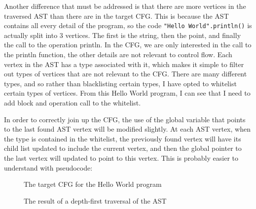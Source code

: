 Another difference that must be addressed is that there are more vertices in the traversed AST than there are in the target CFG. This is because the AST contains all every detail of the program, so the code \verb|"Hello World".println()| is actually split into 3 vertices. The first is the string, then the point, and finally the call to the operation println. In the CFG, we are only interested in the call to the println function, the other details are not relevant to control flow. Each vertex in the AST has a type associated with it, which makes it simple to filter out types of vertices that are not relevant to the CFG. There are many different types, and so rather than blacklisting certain types, I have opted to whitelist certain types of vertices. From this Hello World program, I can see that I need to add block and operation call to the whitelist.

In order to correctly join up the CFG, the use of the global variable that points to the last found AST vertex will be modified slightly. At each AST vertex, when the type is contained in the whitelist, the previously found vertex will have its child list updated to include the current vertex, and then the global pointer to the last vertex will updated to point to this vertex. This is probably easier to understand with pseudocode:

\begin{samepage}

\end{samepage}

\begin{figure}
\centering
\begin{minipage}{.4\textwidth}
  \centering
    \caption{The target CFG for the Hello World program}
    \label{fig:helloWorldCFG}
\end{minipage}%
\begin{minipage}{.15\textwidth}
\hspace{1cm}
\end{minipage}
\begin{minipage}{.4\textwidth}
  \centering
  \caption{The result of a depth-first traversal of the AST}
  \label{fig:helloWorldDF}
\end{minipage}
\end{figure}

